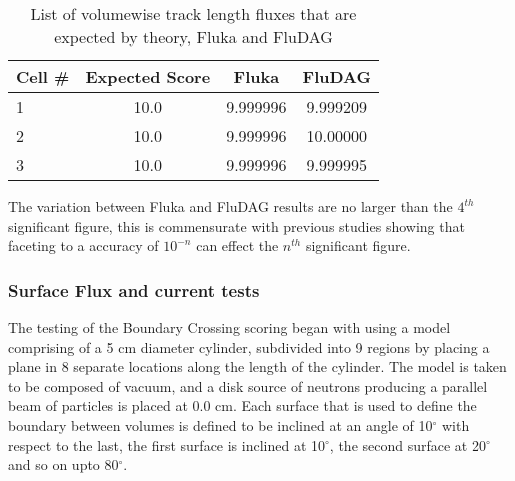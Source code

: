 \documentclass{anstrans}[12pt]
\begin{document}
\begin{table}%
	\begin{center}
		\begin{tabular}{|l|c|c|c|}
			\hline
			Cell \# & Expected Score & Fluka  & FluDAG \\
			\hline
			1 & 10.0 & 9.999996 & 9.999209 \\
			2 & 10.0 & 9.999996 & 10.00000 \\
			3 & 10.0 & 9.999996 & 9.999995 \\
			\hline
		\end{tabular}
		\caption{List of volumewise track length fluxes that are 
			expected by theory, Fluka and FluDAG}\label{usrtrack_comp_sphere}

	\end{center}
\end{table}

The variation between Fluka and FluDAG results are no larger than the
$4^{th}$ significant figure, this is commensurate with previous
studies \cite{snouffer_ans} showing that faceting to a accuracy of $10^{-n}$ can
effect the $n^{th}$ significant figure. 

\subsubsection*{Surface Flux and current tests}
The testing of the Boundary Crossing scoring began with using a model
comprising of a 5 cm diameter cylinder, subdivided into 9 regions by
placing a plane in 8 separate locations along the length of the
cylinder. The model is taken to be composed of vacuum, and a disk
source of neutrons producing a parallel beam of particles is placed at
0.0 cm. Each surface that is used to define the boundary between
volumes is defined to be inclined at an angle of 10$^{\circ}$ with respect to the
last, the first surface is inclined at 10$^{\circ}$, the second
surface at 20$^{\circ}$ and so on upto 80$^{\circ}$.

\end{document}
